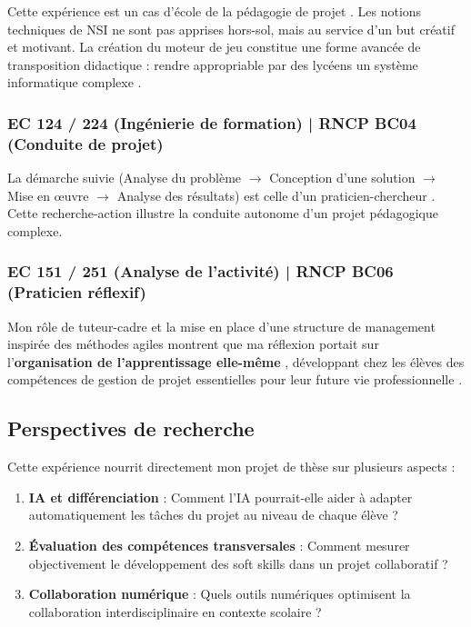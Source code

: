Cette expérience est un cas d'école de la pédagogie de projet \parencite{kilpatrick_project_method,dewey_experience_education,projet_methode_tlem}. Les notions techniques de NSI ne sont pas apprises hors-sol, mais au service d'un but créatif et motivant. La création du moteur de jeu constitue une forme avancée de transposition didactique : rendre appropriable par des lycéens un système informatique complexe \parencite{chevallard_transposition}.

\subsubsection{EC 124 / 224 (Ingénierie de formation) | RNCP BC04 (Conduite de projet)}

La démarche suivie (Analyse du problème $\rightarrow$ Conception d'une solution $\rightarrow$ Mise en œuvre $\rightarrow$ Analyse des résultats) est celle d'un praticien-chercheur \parencite{schon_reflective_practitioner,recherche_action_education}. Cette recherche-action illustre la conduite autonome d'un projet pédagogique complexe.

\subsubsection{EC 151 / 251 (Analyse de l'activité) | RNCP BC06 (Praticien réflexif)}

Mon rôle de tuteur-cadre et la mise en place d'une structure de management inspirée des méthodes agiles montrent que ma réflexion portait sur l'\textbf{organisation de l'apprentissage elle-même} \parencite{perrenoud_pratique_reflexive}, développant chez les élèves des compétences de gestion de projet essentielles pour leur future vie professionnelle \parencite{competences_transversales,scrum_education}.

\subsection{Perspectives de recherche}

Cette expérience nourrit directement mon projet de thèse sur plusieurs aspects \parencite{intelligence_artificielle_education} :

\begin{enumerate}[leftmargin=*]
    \item \textbf{IA et différenciation} : Comment l'IA pourrait-elle aider à adapter automatiquement les tâches du projet au niveau de chaque élève ?
    \item \textbf{Évaluation des compétences transversales} : Comment mesurer objectivement le développement des soft skills dans un projet collaboratif ?
    \item \textbf{Collaboration numérique} : Quels outils numériques optimisent la collaboration interdisciplinaire en contexte scolaire ?
\end{enumerate}

